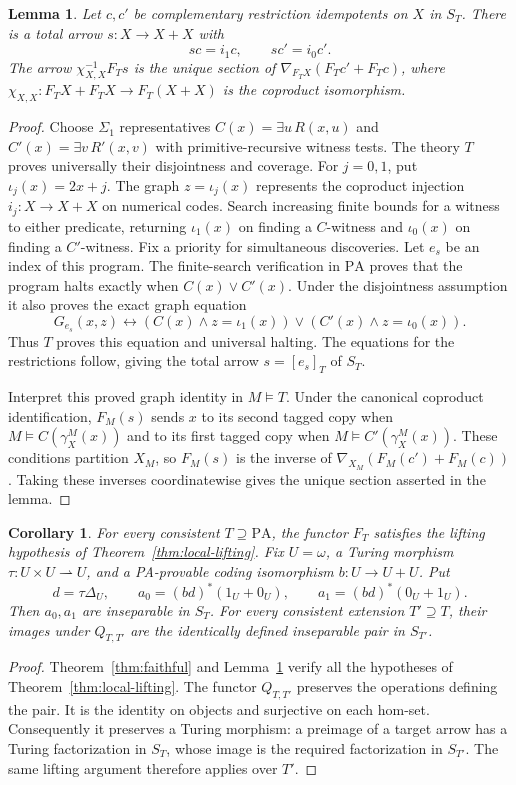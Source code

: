 \documentclass[11pt]{article}
\newtheorem{lemma}[theorem]{Lemma}
\newtheorem{corollary}[theorem]{Corollary}
\newcommand{\PA}{\mathrm{PA}}
\begin{document}
\begin{lemma}\label{lem:switch}
Let $c,c'$ be complementary restriction idempotents on $X$ in $S_T$.
There is a total arrow $s:X\to X+X$ with
\[
 sc=i_1c,\qquad sc'=i_0c'.
\]
The arrow $\chi_{X,X}^{-1}F_Ts$ is the unique section of
$\nabla_{F_TX}(F_Tc'+F_Tc)$, where
$\chi_{X,X}:F_TX+F_TX\to F_T(X+X)$ is the coproduct isomorphism.
\end{lemma}
\begin{proof}
Choose $\Sigma_1$ representatives $C(x)=\exists u\,R(x,u)$ and
$C'(x)=\exists v\,R'(x,v)$ with primitive-recursive witness tests.
The theory $T$ proves universally their disjointness and coverage.
For $j=0,1$, put $\iota_j(x)=2x+j$. The graph
$z=\iota_j(x)$ represents the coproduct injection
$i_j:X\to X+X$ on numerical codes.
Search increasing finite bounds for a witness to either predicate,
returning $\iota_1(x)$ on finding a $C$-witness and $\iota_0(x)$
on finding a $C'$-witness. Fix a priority for simultaneous discoveries.
Let $e_s$ be an index of this program. The finite-search verification
in $\PA$ proves that the program halts
exactly when $C(x)\lor C'(x)$. Under the disjointness assumption it also
proves the exact graph equation
\[
 G_{e_s}(x,z)\leftrightarrow
 (C(x)\land z=\iota_1(x))\lor(C'(x)\land z=\iota_0(x)).
\]
Thus $T$ proves this equation and universal halting. The equations for
the restrictions follow, giving the total arrow $s=[e_s]_T$ of $S_T$.

Interpret this proved graph identity in $M\models T$.
Under the canonical coproduct identification, $F_M(s)$ sends
$x$ to its second tagged copy when
$M\models C(\gamma_X^M(x))$ and to its first tagged copy when
$M\models C'(\gamma_X^M(x))$.
These conditions partition $X_M$, so $F_M(s)$ is the inverse of
$\nabla_{X_M}(F_M(c')+F_M(c))$.
Taking these inverses coordinatewise gives the unique section
asserted in the lemma.
\end{proof}

\begin{corollary}\label{cor:pair}
For every consistent $T\supseteq\PA$, the functor $F_T$ satisfies the
lifting hypothesis of Theorem~\ref{thm:local-lifting}.
Fix $U=\omega$, a Turing morphism $\tau:U\times U\rightharpoonup U$,
and a PA-provable coding isomorphism $b:U\to U+U$. Put
\[
 d=\tau\Delta_U,\qquad
 a_0=(bd)^*(1_U+0_U),\qquad a_1=(bd)^*(0_U+1_U).
\]
Then $a_0,a_1$ are inseparable in $S_T$. For every consistent
extension $T'\supseteq T$, their images under $Q_{T,T'}$ are the
identically defined inseparable pair in $S_{T'}$.
\end{corollary}
\begin{proof}
Theorem~\ref{thm:faithful} and Lemma~\ref{lem:switch} verify all the
hypotheses of Theorem~\ref{thm:local-lifting}.
The functor $Q_{T,T'}$ preserves the operations defining the pair.
It is the identity on objects and surjective on each hom-set.
Consequently it preserves a Turing morphism: a preimage of a
target arrow has a Turing factorization in $S_T$, whose image is
the required factorization in $S_{T'}$.
The same lifting argument therefore applies over $T'$.
\end{proof}
\end{document}
